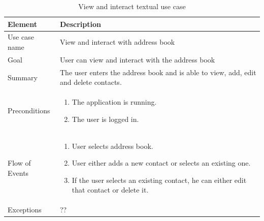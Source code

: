 \begin{table}
\begin{tabular}{p{3cm}|p{12cm}}
Element & Description \\ \hline
Use case name & View and interact with address book \\
Goal & User can view and interact with the address book \\
Summary &The user enters the address book and is able to view, add, edit and delete contacts. \\
Preconditions &
\begin{enumerate}
\item{}The application is running.
\item{}The user is logged in.
\end{enumerate} \\ \hline
Flow of Events &
\begin{enumerate}
\item{}User selects address book.
\item{}User either adds a new contact or selects an existing one.
\item{}If the user selects an existing contact, he can either edit that contact or delete it.
\end{enumerate} \\ \hline
Exceptions & ??
\end{tabular}
\caption{View and interact textual use case} \label{tab:viewandinteract}
\end{table}